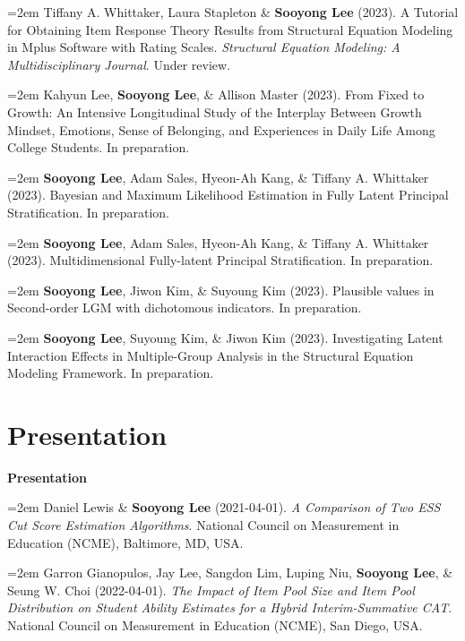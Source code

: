 \documentclass[11pt,letterpaper,]{awesome-me}
\begin{document}
\hangindent=2em  Tiffany A. Whittaker, Laura Stapleton \&
\textbf{Sooyong Lee} (2023). A Tutorial for Obtaining Item Response
Theory Results from Structural Equation Modeling in Mplus Software with
Rating Scales. \emph{Structural Equation Modeling: A Multidisciplinary
Journal}. Under review.

\hangindent=2em  Kahyun Lee, \textbf{Sooyong Lee}, \&
Allison Master (2023). From Fixed to Growth: An Intensive Longitudinal
Study of the Interplay Between Growth Mindset, Emotions, Sense of
Belonging, and Experiences in Daily Life Among College Students. In
preparation.

\hangindent=2em  \textbf{Sooyong Lee}, Adam Sales, Hyeon-Ah
Kang, \& Tiffany A. Whittaker (2023). Bayesian and Maximum Likelihood
Estimation in Fully Latent Principal Stratification. In preparation.

\hangindent=2em  \textbf{Sooyong Lee}, Adam Sales, Hyeon-Ah
Kang, \& Tiffany A. Whittaker (2023). Multidimensional Fully-latent
Principal Stratification. In preparation.

\hangindent=2em  \textbf{Sooyong Lee}, Jiwon Kim, \& Suyoung
Kim (2023). Plausible values in Second-order LGM with dichotomous
indicators. In preparation.

\hangindent=2em  \textbf{Sooyong Lee}, Suyoung Kim, \& Jiwon
Kim (2023). Investigating Latent Interaction Effects in Multiple-Group
Analysis in the Structural Equation Modeling Framework. In preparation.

\setlength{\leftskip}{0cm}

\hypertarget{presentation}{%
\section{Presentation}\label{presentation}}

\setlength{\leftskip}{0cm}

\textbf{Presentation}

\setlength{\leftskip}{0.5cm}

\hangindent=2em  Daniel Lewis \& \textbf{Sooyong Lee}
(2021-04-01). \emph{A Comparison of Two ESS Cut Score Estimation
Algorithms}. National Council on Measurement in Education (NCME),
Baltimore, MD, USA.

\hangindent=2em  Garron Gianopulos, Jay Lee, Sangdon Lim,
Luping Niu, \textbf{Sooyong Lee}, \& Seung W. Choi (2022-04-01).
\emph{The Impact of Item Pool Size and Item Pool Distribution on Student
Ability Estimates for a Hybrid Interim-Summative CAT}. National Council
on Measurement in Education (NCME), San Diego, USA.
\end{document}
